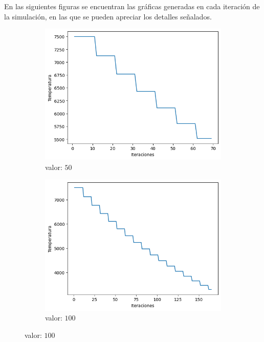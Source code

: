 \documentclass[a4paper,12pt]{article}
\begin{document}
	En las siguientes figuras se encuentran las gráficas generadas en cada iteración de la simulación, en las que se pueden apreciar los detalles señalados.
	
	\begin{figure}[H]
		\centering
		\begin{subfigure}{0.24\textwidth}
			\centering
			\includegraphics[width=\textwidth]{include/parada/50/temp.png}
			\caption{valor: $50$}
		\end{subfigure}
		\hfill
		\begin{subfigure}{0.24\textwidth}
			\centering
			\includegraphics[width=\textwidth]{include/parada/100/temp.png}
			\caption{valor: $100$}
		\end{subfigure}

\end{figure}
\end{document}
